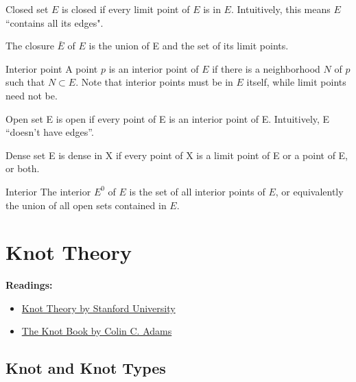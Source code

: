 \begin{defn}{Closed set}{}
$E$ is closed if every limit point of $E$ is in $E$. Intuitively, this means $E$ ``contains all its edges".

The closure $\bar{E}$ of $E$ is the union of E and the set of its limit points.
\end{defn}

\begin{defn}{Interior point}{}
A point $p$ is an interior point of $E$ if there is a neighborhood $N$ of $p$ such that $N \subset E$. Note that interior points must be in $E$ itself, while limit points need not be.
\end{defn}

\begin{defn}{Open set}{}
E is open if every point of E is an interior point of E. Intuitively, E “doesn’t have edges”.
\end{defn}

\begin{defn}{Dense set}{}
E is dense in X if every point of X is a limit point of E or a point of E, or both.
\end{defn}

\begin{defn}{Interior}{}
The interior $E^0$ of $E$ is the set of all interior points of $E$, or equivalently the union of all open sets contained in $E$.
\end{defn}


\chapter{Knot Theory}
\textbf{Readings:}
\begin{itemize}
\item \href{https://stanford.edu/~sfh/knot.pdf}{Knot Theory by Stanford University}
\item \href{https://www.math.cuhk.edu.hk/course_builder/1920/math4900e/Adams--The%20Knot%20Book.pdf}{The Knot Book by Colin C. Adams}
\end{itemize}

\section{Knot and Knot Types}
